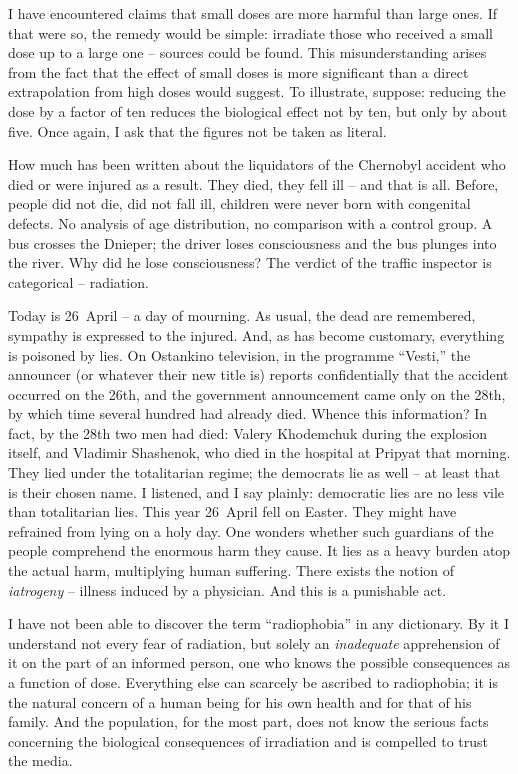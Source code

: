 \documentclass[openright]{bookest}
\begin{document}
I have encountered claims that small doses are more harmful than large ones. If that were so, the remedy would be simple: irradiate those who received a small dose up to a large one -- sources could be found. This misunderstanding arises from the fact that the effect of small doses is more significant than a direct extrapolation from high doses would suggest. To illustrate, suppose: reducing the dose by a factor of ten reduces the biological effect not by ten, but only by about five. Once again, I ask that the figures not be taken as literal.

How much has been written about the liquidators of the Chernobyl accident who died or were injured as a result. They died, they fell ill -- and that is all. Before, people did not die, did not fall ill, children were never born with congenital defects. No analysis of age distribution, no comparison with a control group. A bus crosses the Dnieper; the driver loses consciousness and the bus plunges into the river. Why did he lose consciousness? The verdict of the traffic inspector is categorical -- radiation.

Today is 26~April -- a day of mourning. As usual, the dead are remembered, sympathy is expressed to the injured. And, as has become customary, everything is poisoned by lies. On Ostankino television, in the programme ``Vesti,'' the announcer (or whatever their new title is) reports confidentially that the accident occurred on the 26th, and the government announcement came only on the 28th, by which time several hundred had already died. Whence this information? In fact, by the 28th two men had died: Valery Khodemchuk during the explosion itself, and Vladimir Shashenok, who died in the hospital at Pripyat that morning. They lied under the totalitarian regime; the democrats lie as well -- at least that is their chosen name. I listened, and I say plainly: democratic lies are no less vile than totalitarian lies. This year 26~April fell on Easter. They might have refrained from lying on a holy day. One wonders whether such guardians of the people comprehend the enormous harm they cause. It lies as a heavy burden atop the actual harm, multiplying human suffering. There exists the notion of \textit{iatrogeny} -- illness induced by a physician. And this is a punishable act.

I have not been able to discover the term ``radiophobia'' in any dictionary. By it I understand not every fear of radiation, but solely an \textit{inadequate} apprehension of it on the part of an informed person, one who knows the possible consequences as a function of dose. Everything else can scarcely be ascribed to radiophobia; it is the natural concern of a human being for his own health and for that of his family. And the population, for the most part, does not know the serious facts concerning the biological consequences of irradiation and is compelled to trust the media.
\end{document}
